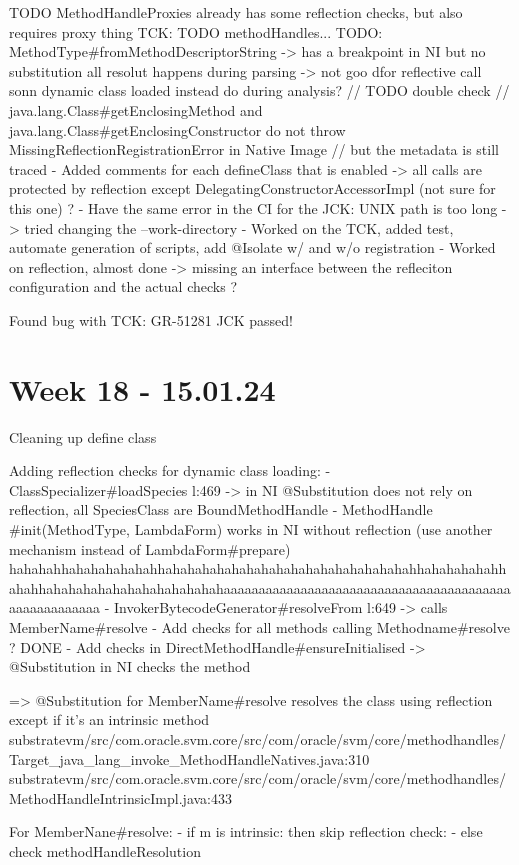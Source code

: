 TODO MethodHandleProxies already has some reflection checks, but also requires proxy thing
TCK: TODO methodHandles...
TODO: MethodType#fromMethodDescriptorString -> has a breakpoint in NI but no substitution
all resolut happens during parsing -> not goo dfor reflective call sonn dynamic class loaded
instead do during analysis?
        // TODO double check
        // java.lang.Class#getEnclosingMethod and java.lang.Class#getEnclosingConstructor do not throw MissingReflectionRegistrationError in Native Image
        // but the metadata is still traced
- Added comments for each defineClass that is enabled -> all calls are protected by reflection except DelegatingConstructorAccessorImpl (not sure for this one) ?
- Have the same error in the CI for the JCK: UNIX path is too long -> tried changing the --work-directory
- Worked on the TCK, added test, automate generation of scripts, add @Isolate w/ and w/o registration 
- Worked on reflection, almost done -> missing an interface between the refleciton configuration and the actual checks ?

Found bug with TCK: GR-51281
JCK passed!
\section{Week 18 - 15.01.24}
Cleaning up define class

Adding reflection checks for dynamic class loading:
- ClassSpecializer#loadSpecies l:469 -> in NI @Substitution does not rely on reflection, all SpeciesClass are BoundMethodHandle
- MethodHandle #init(MethodType, LambdaForm) works in NI without reflection (use another mechanism instead of LambdaForm#prepare) hahahahhahahahahahahhahahahahahahahahahahahahahahahahahhahahahahahhahahhahahahahahahahahahahahahaaaaaaaaaaaaaaaaaaaaaaaaaaaaaaaaaaaaaaaaaaaaaaaaaaaaaa
- InvokerBytecodeGenerator#resolveFrom l:649 -> calls MemberName#resolve
- Add checks for all methods calling Methodname#resolve ? DONE
- Add checks in DirectMethodHandle#ensureInitialised -> @Substitution in NI checks the method


=> @Substitution for MemberName#resolve resolves the class using reflection except if it's an intrinsic method
substratevm/src/com.oracle.svm.core/src/com/oracle/svm/core/methodhandles/Target_java_lang_invoke_MethodHandleNatives.java:310
substratevm/src/com.oracle.svm.core/src/com/oracle/svm/core/methodhandles/MethodHandleIntrinsicImpl.java:433

For MemberNane#resolve:
 - if m is intrinsic: then skip reflection check:
 - else check methodHandleResolution


